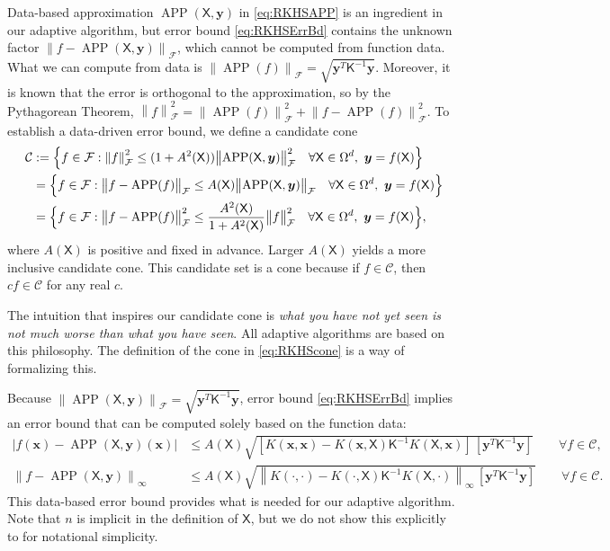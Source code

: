 \documentclass[]{mcom-l}
\theoremstyle{remark}
\DeclareMathOperator{\APP}{APP}
\newcommand{\mK}{\mathsf{K}}
\newcommand{\mX}{\mathsf{X}}
\newcommand{\bx}{{\boldsymbol{x}}}
\newcommand{\by}{{\boldsymbol{y}}}
\newcommand{\calc}{{\mathcal{C}}}
\newcommand{\calf}{{\mathcal{F}}}
\def\abs#1{\ensuremath{\left \lvert #1 \right \rvert}}
\newcommand{\norm}[2][{}]{\ensuremath{\left \lVert #2 \right \rVert}_{#1}}
\newcommand{\bignorm}[2][{}]{\ensuremath{\bigl \lVert #2 \bigr \rVert}_{#1}}
\begin{document}
Data-based approximation $\APP(\mX,\by)$ in \eqref{eq:RKHSAPP} is an ingredient in our adaptive algorithm, but error bound \eqref{eq:RKHSErrBd} contains the unknown factor $\norm[\calf]{f - \APP(\mX,\by)}$, which cannot be computed from function data.  What we can compute from data is $\bignorm[\calf]{\APP(f)} = \sqrt{\by^T \mK^{-1} \by}$.  Moreover, it is known that the error is orthogonal to the approximation, so by the Pythagorean Theorem,  $\norm[\calf]{f}^2  = \bignorm[\calf]{\APP(f)}^2 + \bignorm[\calf]{f - \APP(f)}^2$.  To establish a data-driven error bound, we define a candidate cone
\begin{align} \label{eq:RKHScone}
\calc &:= \Bigl\{f \in \calf : \norm[\calf]{f}^2 \le (1 + A^2(\mX)) \bignorm[\calf]{\APP(\mX,\by)}^2 \quad \forall \mX \in \Omega^d, \ \by = f(\mX) \Bigr \} \\
\nonumber
& = \Bigl \{f \in \calf : \bignorm[\calf]{f - \APP(f)} \le A(\mX) \bignorm[\calf]{\APP(\mX,\by)} \quad \forall \mX \in \Omega^d, \ \by = f(\mX) \Bigr \} \\
\nonumber
& = \Bigl \{f \in \calf : \bignorm[\calf]{f - \APP(f)}^2 \le \frac{A^2(\mX)}{1 + A^2(\mX)} \bignorm[\calf]{f}^2 \quad \forall \mX \in \Omega^d, \ \by = f(\mX) \Bigr \},
\end{align}
where $A(\mX)$ is positive and fixed in advance. Larger $A(\mX)$ yields a more inclusive candidate cone.  This candidate set is a cone because if $f \in \calc$, then $c f \in \calc$ for any real $c$. 

The intuition that inspires our candidate cone is \emph{what you have not yet seen is not much worse than what you have seen}. All adaptive algorithms are based on this philosophy. The definition of the cone in \eqref{eq:RKHScone} is a way of formalizing this. 

Because $\bignorm[\calf]{\APP(\mX,\by)} = \sqrt{\by^T \mK^{-1} \by}$, error bound \eqref{eq:RKHSErrBd} implies an error bound that can be computed solely based on the function data: 
\begin{subequations} \label{eq:DataErrBd}
\begin{align}
\label{eq:DataErrBdA}
    \abs{f(\bx) - \APP(\mX,\by)(\bx)} & \le   A(\mX) \sqrt{[K(\bx,\bx) - K(\bx,\mX) \mK^{-1} K(\mX,\bx) ] \, [\by^T \mK^{-1} \by] } \qquad \forall f \in \calc, \\
    \label{eq:DataErrBdB}
    \norm[\infty]{f - \APP(\mX,\by)} & \le   A(\mX) \sqrt{\norm[\infty]{K(\cdot,\cdot) - K(\cdot,\mX) \mK^{-1} K(\mX,\cdot)} \, [\by^T \mK^{-1} \by] } \qquad \forall f \in \calc.
\end{align}
\end{subequations}
This data-based error bound provides what is needed for our adaptive algorithm.  Note that $n$ is implicit in the definition of $\mX$, but we do not show this explicitly to for notational simplicity.
\end{document}
